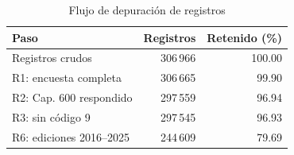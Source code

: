 \begin{table}[!htb]
\centering
\caption{Flujo de depuración de registros}
\label{tab:flujo}
\footnotesize
\begin{tabular}{@{}lrr@{}}
\toprule
Paso & Registros & Retenido (\%) \\
\midrule
Registros crudos & 306\,966 & 100.00 \\
R1: encuesta completa & 306\,665 & 99.90 \\
R2: Cap. 600 respondido & 297\,559 & 96.94 \\
R3: sin código 9 & 297\,545 & 96.93 \\
R6: ediciones 2016–2025 & 244\,609 & 79.69 \\
\bottomrule
\end{tabular}
\end{table}
